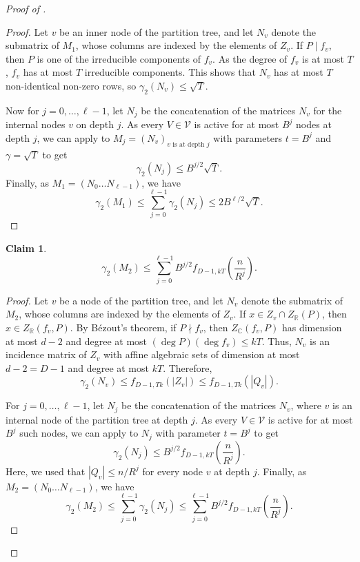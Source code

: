 \documentclass[11pt]{article}
\theoremstyle{plain}
\newtheorem{claim}[theorem]{Claim}
\theoremstyle{definition}
\begin{document}
\begin{proof}[Proof of ]
		\begin{proof}
			Let $v$ be an inner node of the partition tree, and let $N_v$ denote the submatrix of $M_1$, whose columns are indexed by the elements of $Z_v$. If $P\mid f_v$, then $P$ is one of the irreducible components of $f_v$. As the degree of $f_v$ is at most $T$, $f_v$ has at most $T$ irreducible components. This shows that $N_v$ has at most $T$ non-identical non-zero rows, so $\gamma_2(N_v)\leq \sqrt{T}$.
			
			Now for $j=0,\dots,\ell-1$, let $N_{j}$ be the concatenation of the matrices $N_v$ for the internal nodes $v$ on depth $j$. As every $V\in \mathcal{V}$ is active for at most $B^j$ nodes at depth $j$, we can apply  to $M_j=(N_v)_{v\text{ is at depth }j}$ with parameters $t=B^j$ and $\gamma=\sqrt{T}$ to get
			$$\gamma_2(N_j)\leq B^{j/2}\sqrt{T}.$$
			Finally, as $M_1=(N_0\dots N_{\ell-1})$, we have
			$$\gamma_2(M_1)\leq \sum_{j=0}^{\ell-1}\gamma_2(N_j)\leq 2 B^{\ell/2}\sqrt{T}.$$
		\end{proof}
		
		\begin{claim}
			$$\gamma_2(M_2)\leq \sum_{j=0}^{\ell-1}B^{j/2}f_{D-1,kT}\left(\frac{n}{R^j}\right).$$
		\end{claim}
		\begin{proof}
			Let $v$ be a node of the partition tree, and let $N_v$ denote the submatrix of $M_2$, whose columns are indexed by the elements of $Z_v$. If $x\in Z_v\cap Z_{\mathbb{R}}(P)$, then $x\in Z_{\mathbb{R}}(f_v,P)$. By B\'ezout's theorem, if $P\nmid f_v$, then $Z_{\mathbb{C}}(f_v,P)$ has dimension at most $d-2$ and degree at most $(\deg P)(\deg f_v)\leq kT$. Thus, $N_v$ is an incidence matrix of $Z_v$ with affine algebraic sets of dimension at most $d-2=D-1$ and  degree at most $kT$. Therefore,
			$$\gamma_2(N_v)\leq f_{D-1,Tk}(|Z_v|)\leq f_{D-1,Tk}(|Q_v|).$$
			
			For $j=0,\dots,\ell-1$, let $N_{j}$ be the concatenation of the matrices $N_v$, where $v$ is an internal node of the partition tree at depth $j$. As every $V\in \mathcal{V}$ is active for at most $B^j$ such nodes, we can apply  to $N_j$ with parameter $t=B^j$ to get
			$$\gamma_2(N_j)\leq B^{j/2}f_{D-1,kT}\left(\frac{n}{R^j}\right).$$
			Here, we used that $|Q_v|\leq n/R^j$ for every node $v$ at depth $j$.
			Finally, as $M_2=(N_0\dots N_{\ell-1})$, we have
			$$\gamma_2(M_2)\leq \sum_{j=0}^{\ell-1}\gamma_2(N_j)\leq \sum_{j=0}^{\ell-1}B^{j/2}f_{D-1,kT}\left(\frac{n}{R^j}\right).$$
		\end{proof}
		

\end{proof}
\end{document}
